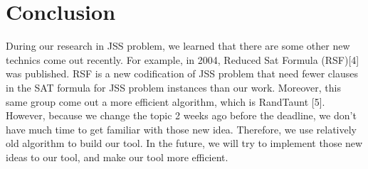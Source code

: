 \section*{Conclusion}
During our research in JSS problem, we learned that there are some other new technics come out recently. For example, in 2004, Reduced Sat Formula (RSF)[4] was published. RSF is a new codification of JSS problem that need fewer clauses in the SAT formula for JSS problem instances than our work. Moreover, this same group come out a more efficient algorithm, which is RandTaunt [5]. However, because we change the topic 2 weeks ago before the deadline, we don’t have much time to get familiar with those new idea. Therefore, we use relatively old algorithm to build our tool. In the future, we will try to implement those new ideas to our tool, and make our tool more efficient. 